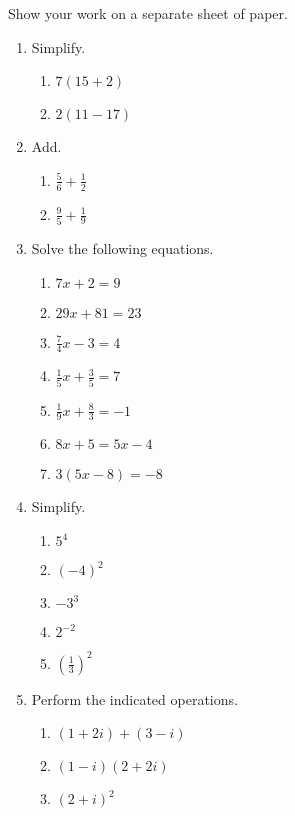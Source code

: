 \documentclass{article}
\begin{document}
\ReviewTitle[class={College Algebra}, for={Prereq}]

Show your work on a separate sheet of paper.
\begin{enumerate}
\item Simplify.
\begin{enumerate}
\item $7\left(15 + 2\right)$
\item $2\left(11 - 17\right)$
\end{enumerate}


\item Add.
\begin{enumerate}
\item $\frac{5}{6} + \frac{1}{2}$
\item $\frac{9}{5} + \frac{1}{9}$
\end{enumerate}


\item Solve the following equations.
\begin{enumerate}
\item $7x+2 = 9$
\item $29x+81 = 23$
\item $\frac{7}{4}x-3 = 4$
\item $\frac{1}{5}x+\frac{3}{5} = 7$
\item $\frac{1}{9}x+\frac{8}{3} = -1$
\item $8x+5 = 5x-4$
\item $3\left(5x-8\right) = -8$
\end{enumerate}


\item Simplify.
\begin{enumerate}
\item ${5}^{4}$
\item ${\left(-4\right)}^{2}$
\item ${-3}^{3}$
\item ${2}^{-2}$
\item ${\left(\frac{1}{3}\right)}^{2}$
\end{enumerate}


\item Perform the indicated operations.
\begin{enumerate}
\item $(1 + 2i) + (3 - i)$
\item $(1-i)(2+2i)$
\item $(2+i)^2$
\end{enumerate}
\end{enumerate}
\end{document}
